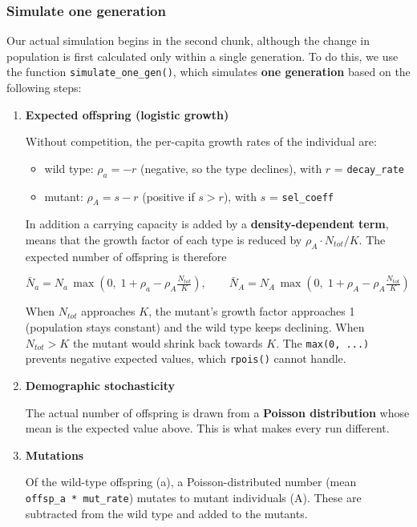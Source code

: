 \documentclass[
]{article}
\begin{document}
\subsubsection{Simulate one generation}\label{simulate-one-generation}

Our actual simulation begins in the second chunk, although the change in
population is first calculated only within a single generation. To do
this, we use the function \texttt{simulate\_one\_gen()}, which simulates
\textbf{one generation} based on the following steps:

\begin{enumerate}
\def\labelenumi{\arabic{enumi}.}
\item
  \textbf{Expected offspring (logistic growth)}

  Without competition, the per-capita growth rates of the individual
  are:

  \begin{itemize}
  \item
    wild type: \(\rho_a = -r\) (negative, so the type declines), with
    \(r\) = \texttt{decay\_rate}
  \item
    mutant: \(\rho_A = s - r\) (positive if \(s > r\)), with \(s\) =
    \texttt{sel\_coeff}
  \end{itemize}

  In addition a carrying capacity is added by a
  \textbf{density-dependent term}, means that the growth factor of each
  type is reduced by \(\rho_A \cdot N_{tot}/K\). The expected number of
  offspring is therefore

  \[\bar N_a = N_a\,\max\!\left(0,\;1+\rho_a-\rho_A \tfrac{N_{tot}}{K}\right), \qquad \bar N_A = N_A\,\max\!\left(0,\;1+\rho_A-\rho_A \tfrac{N_{tot}}{K}\right)\]

  When \(N_{tot}\) approaches \(K\), the mutant's growth factor
  approaches 1 (population stays constant) and the wild type keeps
  declining. When \(N_{tot} > K\) the mutant would shrink back towards
  \(K\). The \texttt{max(0,\ ...)} prevents negative expected values,
  which \texttt{rpois()} cannot handle.
\item
  \textbf{Demographic stochasticity}

  The actual number of offspring is drawn from a \textbf{Poisson
  distribution} whose mean is the expected value above. This is what
  makes every run different.
\item
  \textbf{Mutations}

  Of the wild-type offspring (a), a Poisson-distributed number (mean
  \texttt{offsp\_a\ *\ mut\_rate}) mutates to mutant individuals (A).
  These are subtracted from the wild type and added to the mutants.
\end{enumerate}
\end{document}
